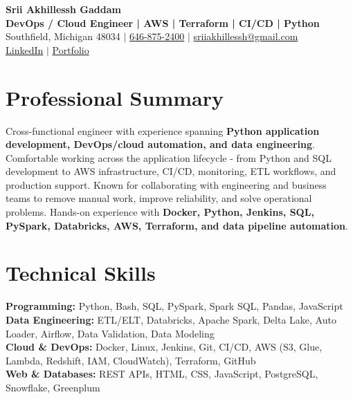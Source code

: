 \documentclass[letterpaper,10pt]{article}
\begin{document}
\fontsize{9.35pt}{10.45pt}\selectfont

\begin{center}
    {\LARGE \textbf{Srii Akhillessh Gaddam}} \\[-1pt]
    \textbf{DevOps / Cloud Engineer | AWS | Terraform | CI/CD | Python} \\[2pt]
    Southfield, Michigan 48034 $|$
    \href{tel:6468752400}{646-875-2400} $|$
    \href{mailto:sriiakhillessh@gmail.com}{sriiakhillessh@gmail.com} \\[1pt]
    \href{https://www.linkedin.com/in/srii-akhiilessh-gaddam-b48668191/}{LinkedIn} $|$
    \href{https://sriiakhillesshg.github.io/portfolio/}{Portfolio}
\end{center}
\vspace{-8pt}

\section{Professional Summary}
\small{Cross-functional engineer with experience spanning \textbf{Python application development, DevOps/cloud automation, and data engineering}. Comfortable working across the application lifecycle - from Python and SQL development to AWS infrastructure, CI/CD, monitoring, ETL workflows, and production support. Known for collaborating with engineering and business teams to remove manual work, improve reliability, and solve operational problems. Hands-on experience with \textbf{Docker, Python, Jenkins, SQL, PySpark, Databricks, AWS, Terraform, and data pipeline automation}.}

\section{Technical Skills}
\small{
\textbf{Programming:} Python, Bash, SQL, PySpark, Spark SQL, Pandas, JavaScript \\
\textbf{Data Engineering:} ETL/ELT, Databricks, Apache Spark, Delta Lake, Auto Loader, Airflow, Data Validation, Data Modeling \\
\textbf{Cloud \& DevOps:} Docker, Linux, Jenkins, Git, CI/CD, AWS (S3, Glue, Lambda, Redshift, IAM, CloudWatch), Terraform, GitHub \\
\textbf{Web \& Databases:} REST APIs, HTML, CSS, JavaScript, PostgreSQL, Snowflake, Greenplum
}
\end{document}
